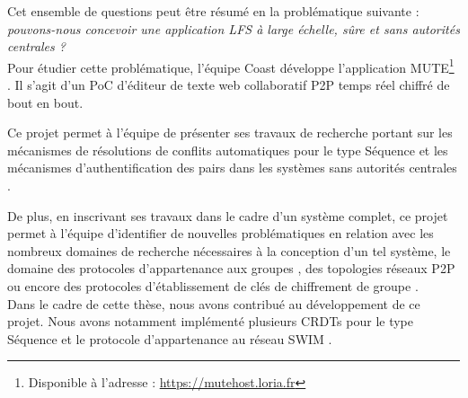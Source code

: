 Cet ensemble de questions peut être résumé en la problématique suivante : \emph{pouvons-nous concevoir une application \ac{LFS} à large échelle, sûre et sans autorités centrales ?}\\

Pour étudier cette problématique, l'équipe Coast développe l'application \acf{MUTE}\footnote{Disponible à l'adresse : \url{https://mutehost.loria.fr}} \cite{MUTE2017}.
Il s'agit d'un \ac{PoC} d'éditeur de texte web collaboratif \ac{P2P} temps réel chiffré de bout en bout.

Ce projet permet à l'équipe de présenter ses travaux de recherche portant sur les mécanismes de résolutions de conflits automatiques pour le type Séquence \cite{2013-logootsplit,2021-these-vic,2022-rls-tpds-nicolas} et les mécanismes d'authentification des pairs dans les systèmes sans autorités centrales \cite{2018-trusternity-short,2018-trusternity-long}.

De plus, en inscrivant ses travaux dans le cadre d'un système complet, ce projet permet à l'équipe d'identifier de nouvelles problématiques en relation avec les nombreux domaines de recherche nécessaires à la conception d'un tel système, \eg le domaine des protocoles d'appartenance aux groupes \cite{swim2002, lifeguard2018}, des topologies réseaux \ac{P2P} \cite{2018-spray-nedelec} ou encore des protocoles d'établissement de clés de chiffrement de groupe \cite{1995-burmester-desmedt}.\\

Dans le cadre de cette thèse, nous avons contribué au développement de ce projet.
Nous avons notamment implémenté plusieurs \acp{CRDT} pour le type Séquence \cite{2013-logootsplit,2022-rls-tpds-nicolas} et le protocole d'appartenance au réseau SWIM \cite{swim2002}.
